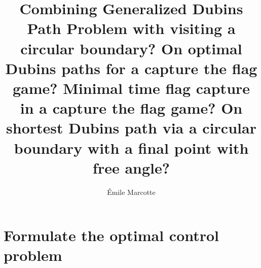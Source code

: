 \documentclass[12pt]{article}
\title{Combining Generalized Dubins Path Problem with visiting a circular boundary? On optimal Dubins paths for a capture the flag game? Minimal time flag capture in a capture the flag game? On shortest Dubins path via a circular boundary with a final point with free angle?}
\author{Émile Marcotte}
\date{}
\begin{document}















\section{Formulate the optimal control problem}
\end{document}
